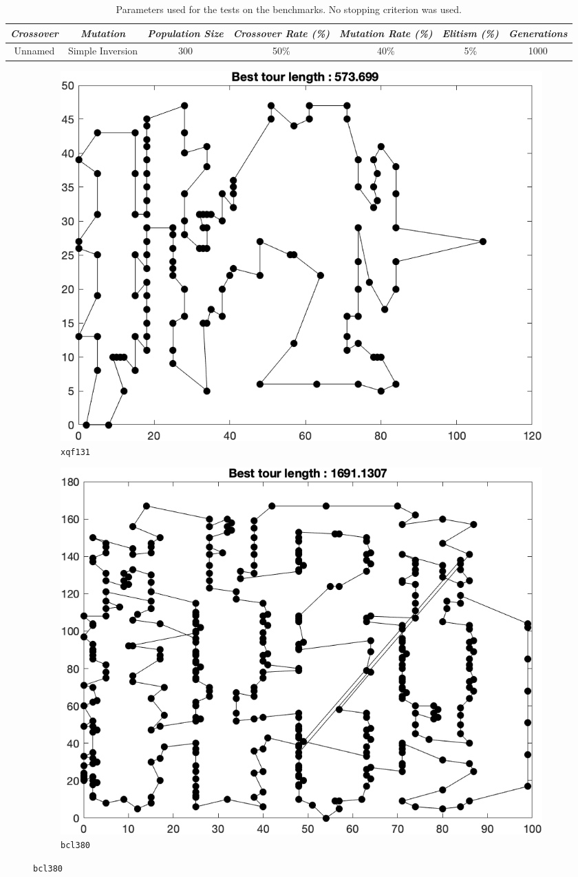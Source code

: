 \begin{table}[h]
\centering
\footnotesize
\begin{tabular}{c|c|c|c|c|c|c}
\textit{Crossover} & \textit{Mutation} & \textit{Population Size} & \textit{Crossover Rate (\%)} & \textit{Mutation Rate (\%)} & \textit{Elitism (\%)} & \textit{Generations} \\\hline 
Unnamed & Simple Inversion & 300 & 50\% & 40\% & 5\% & 1000
\end{tabular}
\caption{Parameters used for the tests on the benchmarks. No stopping criterion was used.}
\label{tab:bench1}
\end{table}

\begin{figure}[H]
	\centering
%
	\begin{subfigure}[b]{0.45\textwidth}
		\centering
		\includegraphics[width=\textwidth]{benchmarks/xqf131.png}
		\caption{\texttt{xqf131}}
    	\end{subfigure}
	\begin{subfigure}[b]{0.45\textwidth}
		\centering
		\includegraphics[width=\textwidth]{benchmarks/bcl380.png}
		\caption{\texttt{bcl380}}
    	\end{subfigure}
\end{figure}
